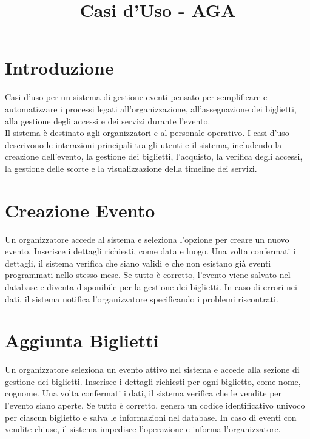 \documentclass[a4paper,12pt]{article}
\title{\textcolor{titlecolor}{\Huge Casi d'Uso - AGA \\ \text{Formato Breve}}}
\author{}
\date{}
\begin{document}
\maketitle

\section*{\textcolor{sectioncolor}{Introduzione}}
\textcolor{textcolor}{

Casi d’uso per un sistema di gestione eventi pensato per semplificare e automatizzare i processi legati all'organizzazione, all'assegnazione dei biglietti, alla gestione degli accessi e dei servizi durante l'evento. \\ Il sistema è destinato agli organizzatori e al personale operativo.
I casi d'uso descrivono le interazioni principali tra gli utenti e il sistema, includendo la creazione dell'evento, la gestione dei biglietti, l'acquisto, la verifica degli accessi, la gestione delle scorte e la visualizzazione della timeline dei servizi.

}

\section{\textcolor{sectioncolor}{Creazione Evento}}
\textcolor{textcolor}{
Un organizzatore accede al sistema e seleziona l'opzione per creare un nuovo evento. Inserisce i dettagli richiesti, come data e luogo. Una volta confermati i dettagli, il sistema verifica che siano validi e che non esistano già eventi programmati nello stesso mese. Se tutto è corretto, l’evento viene salvato nel database e diventa disponibile per la gestione dei biglietti. In caso di errori nei dati, il sistema notifica l’organizzatore specificando i problemi riscontrati.
}

\section{\textcolor{sectioncolor}{Aggiunta Biglietti}}
\textcolor{textcolor}{
Un organizzatore seleziona un evento attivo nel sistema e accede alla sezione di gestione dei biglietti. Inserisce i dettagli richiesti per ogni biglietto, come nome, cognome. Una volta confermati i dati, il sistema verifica che le vendite per l’evento siano aperte. Se tutto è corretto, genera un codice identificativo univoco per ciascun biglietto e salva le informazioni nel database. In caso di eventi con vendite chiuse, il sistema impedisce l’operazione e informa l’organizzatore. 
}
\end{document}
